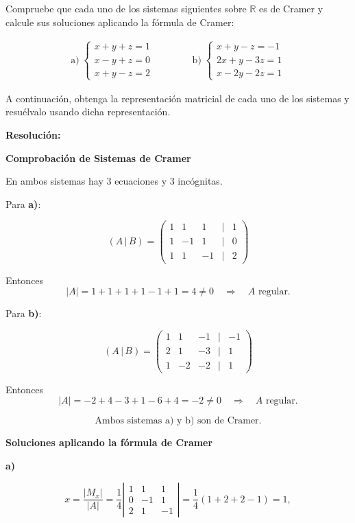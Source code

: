 \documentclass[a4paper,12pt]{article}
\begin{document}
\begin{ejercicio}[title=Ejercicio 25]
Compruebe que cada uno de los sistemas siguientes sobre $\mathbb{R}$ es de Cramer y calcule sus soluciones aplicando la fórmula de Cramer:

\[
\begin{aligned}
\text{a)}\;
\begin{cases}
x + y + z = 1\\
x - y + z = 0\\
x + y - z = 2
\end{cases}
\qquad\qquad
\text{b)}\;
\begin{cases}
x + y - z = -1\\
2x + y - 3z = 1\\
x - 2y - 2z = 1
\end{cases}
\end{aligned}
\]

A continuación, obtenga la representación matricial de cada uno de los sistemas y resuélvalo usando dicha representación.

\tcblower
\textbf{Resolución:}

\textbf{Comprobación de Sistemas de Cramer}

En ambos sistemas hay 3 ecuaciones y 3 incógnitas.

\bigskip

Para \textbf{a)}:

\[
(A \,|\, B) =
\begin{pmatrix}
1 & 1 & 1 &\Big|& 1\\
1 & -1 & 1 &\Big|& 0\\
1 & 1 & -1 &\Big|& 2
\end{pmatrix}
\]

Entonces
\[
|A| = 1+1+1+1-1+1 = 4 \neq 0 \quad\Rightarrow\quad A \text{ regular.}
\]

\bigskip

Para \textbf{b)}:

\[
(A \,|\, B) =
\begin{pmatrix}
1 & 1 & -1 &\Big|& -1\\
2 & 1 & -3 &\Big|& 1\\
1 & -2 & -2 &\Big|& 1
\end{pmatrix}
\]

Entonces
\[
|A| = -2+4-3+1-6+4 = -2 \neq 0 \quad\Rightarrow\quad A \text{ regular.}
\]

\[
\boxed{\text{Ambos sistemas a) y b) son de Cramer.}}
\]

\bigskip

\textbf{Soluciones aplicando la fórmula de Cramer}

\medskip

\textbf{a)}

\[
x = \frac{|M_x|}{|A|} = \frac{1}{4}
\left|
\begin{matrix}
1 & 1 & 1\\
0 & -1 & 1\\
2 & 1 & -1
\end{matrix}
\right|
= \frac{1}{4}(1+2+2-1) = 1,
\]
\end{ejercicio}
\end{document}
